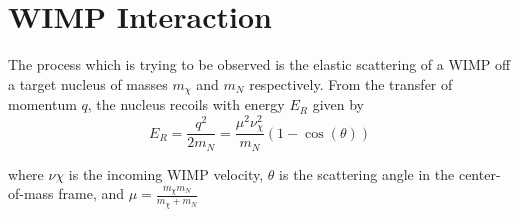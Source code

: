 \section{WIMP Interaction} \label{wimp_theory}

\par
The process which is trying to be observed is the elastic scattering of a WIMP off a target nucleus of masses $m_{\chi}$ and $m_{N}$ respectively.
From the transfer of momentum $q$, the nucleus recoils with energy $E_{R}$ given by
\begin{equation}
    E_{R} = \frac{q^{2}}{2m_{N}} = \frac{\mu^2\nu_{\chi}^2}{m_{N}}(1-\cos(\theta))
\end{equation}

where $\nu{\chi}$ is the incoming WIMP velocity, $\theta$ is the scattering angle in the center-of-mass frame, and $\mu=\frac{m_{\chi}m_{N}}{m_{\chi} + m_{N}}$
